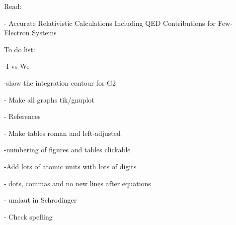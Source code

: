 \documentclass[a4paper,twoside,11pt,normalheadings,headsepline,footsepline,pointlessnumbers]{scrbook}
\begin{document}
%

\tableofcontents

Read:

- Accurate Relativistic Calculations Including QED
Contributions for Few-Electron Systems

To do list:

-I vs We

-show the integration contour for G2

- Make all graphs tik/gnuplot

- References

- Make tables roman and left-adjusted

-numbering of figures and tables clickable

-Add lots of atomic units with lots of digits

- dots, commas and no new lines after equations

- umlaut in Schrodinger

- Check spelling
























\end{document}
